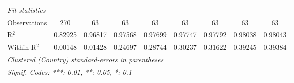 \begin{table}[htbp]
\begin{tabular}{lcccccccc}
      \midrule
      \emph{Fit statistics}\\
      Observations                                                                       & 270      & 63       & 63             & 63             & 63              & 63              & 63             & 63\\  
      R$^2$                                                                              & 0.82925  & 0.96817  & 0.97568        & 0.97699        & 0.97747         & 0.97792         & 0.98038        & 0.98043\\  
      Within R$^2$                                                                       & 0.00148  & 0.01428  & 0.24697        & 0.28744        & 0.30237         & 0.31622         & 0.39245        & 0.39384\\  
      \midrule \midrule
      \multicolumn{9}{l}{\emph{Clustered (Country) standard-errors in parentheses}}\\
      \multicolumn{9}{l}{\emph{Signif. Codes: ***: 0.01, **: 0.05, *: 0.1}}\\
   \end{tabular}
\end{table}


